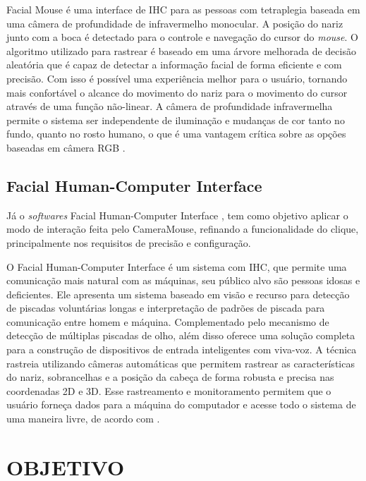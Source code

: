 Facial Mouse é uma interface de IHC para as pessoas com tetraplegia baseada em uma câmera de profundidade de infravermelho monocular. A posição do nariz junto com a boca é detectado para o controle e navegação do cursor do \textit{mouse}. O algoritmo utilizado para rastrear é baseado em uma árvore melhorada de decisão aleatória que é capaz de detectar a informação facial de forma eficiente e com precisão. Com isso é possível uma experiência melhor para o usuário, tornando mais confortável o alcance do movimento do nariz para o movimento do cursor através de uma função não-linear. A câmera de profundidade infravermelha permite o sistema ser independente de iluminação e mudanças de cor tanto no fundo, quanto no rosto humano, o que é uma vantagem crítica sobre as opções baseadas em câmera RGB .

\subsection{Facial Human-Computer Interface}

Já o \textit{softwares} Facial Human-Computer Interface , tem como objetivo aplicar o modo de interação feita pelo CameraMouse, refinando a funcionalidade do clique, principalmente nos requisitos de precisão e configuração.

O Facial Human-Computer Interface é um sistema com IHC, que permite uma comunicação mais natural com as máquinas, seu público alvo são pessoas idosas e deficientes. Ele apresenta um sistema baseado em visão e recurso para detecção de piscadas voluntárias longas e interpretação de padrões de piscada para comunicação entre homem e máquina. Complementado pelo mecanismo de detecção de múltiplas piscadas de olho, além disso oferece uma solução completa para a construção de dispositivos de entrada inteligentes com viva-voz. A técnica rastreia utilizando câmeras automáticas que permitem rastrear as características do nariz, sobrancelhas e a posição da cabeça de forma robusta e precisa nas coordenadas 2D e 3D. Esse rastreamento e monitoramento permitem que o usuário forneça dados para a máquina do computador e acesse todo o sistema de uma maneira livre, de acordo com . 


\section{OBJETIVO}\label{sub:objeto}

